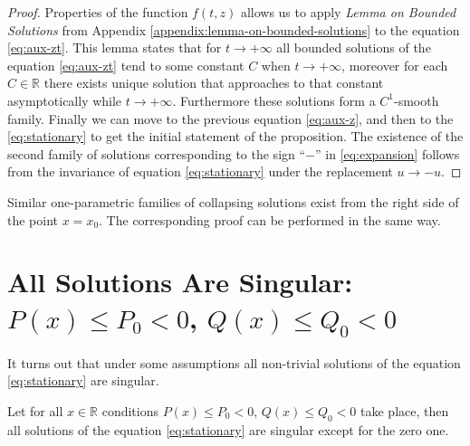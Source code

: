\begin{proof}
	Properties of the function $f(t, z)$ allows us to apply {\it Lemma on Bounded Solutions} from Appendix \ref{appendix:lemma-on-bounded-solutions} to the equation \eqref{eq:aux-zt}.
	This lemma states that for $t \to +\infty$ all bounded solutions of the equation \eqref{eq:aux-zt} tend to some constant $C$ when $t \to +\infty$, moreover for each $C \in \mathbb{R}$ there exists unique solution that approaches to that constant asymptotically while $t \to +\infty$.
	Furthermore these solutions form a $C^1$-smooth family.
	Finally we can move to the previous equation \eqref{eq:aux-z}, and then to the \eqref{eq:stationary} to get the initial statement of the proposition.
	The existence of the second family of solutions corresponding to the sign ``$-$'' in \eqref{eq:expansion} follows from the invariance of equation \eqref{eq:stationary} under the replacement $u \to -u$.
\end{proof}

Similar one-parametric families of collapsing solutions exist from the right side of the point $x = x_0$.
The corresponding proof can be performed in the same way.

\section{All Solutions Are Singular: $P(x) \le P_0 < 0$, $Q(x) \le Q_0 < 0$}

It turns out that under some assumptions all non-trivial solutions of the equation \eqref{eq:stationary} are singular.
\begin{proposition}
	Let for all $x \in \mathbb{R}$ conditions $P(x) \le P_0 < 0$, $Q(x) \le Q_0 < 0$ take place, then all solutions of the equation \eqref{eq:stationary} are singular except for the zero one.
\end{proposition}

